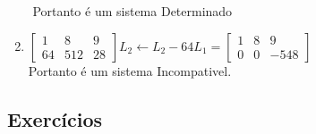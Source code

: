 \begin{resol}
\begin{enumerate}
\begin{math}
                \end{math}
        Portanto é um sistema Determinado
            \item\begin{math}
                \begin{bmatrix}
                    1 & 8 & 9 \\
                    64 & 512 & 28
                \end{bmatrix}
                    L_{2} \leftarrow L_{2} - 64L_{1}
                    =
                \begin{bmatrix}
                    1 & 8 & 9 \\
                    0 & 0 & -548
                \end{bmatrix}
                \end{math} \\
        Portanto é um sistema Incompativel.
        \end{enumerate}
 \end{resol}

\subsection*{Exercícios}

\construirExer

